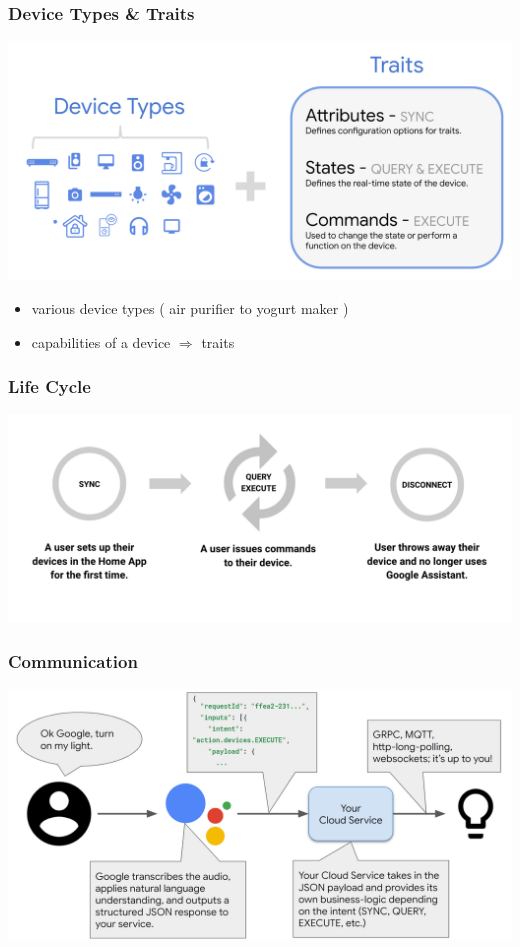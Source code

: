 \documentclass{beamer}
\begin{document}
\begin{frame}
\frametitle{Device Types \& Traits}
\begin{center}
\includegraphics[scale=0.2]{pictures/state_commands.png} 
\end{center}
\begin{itemize}
\item various device types ( air purifier to yogurt maker )
\item capabilities of a device $\Rightarrow$ traits
\end{itemize}
\end{frame}

\begin{frame}
\frametitle{Life Cycle}
\begin{center}
\includegraphics[scale=0.22]{pictures/cycle.png}
\end{center}
\end{frame}

\begin{frame}
\frametitle{Communication}
\begin{center}
\includegraphics[scale=0.22]{pictures/communication_btw.png}
\end{center}
\end{frame}
\end{document}
